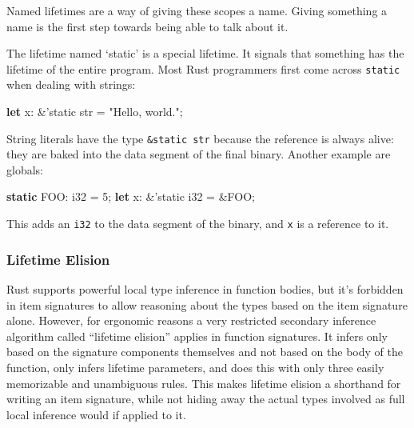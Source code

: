 \documentclass[a4paper,]{book}
\newenvironment{Shaded}{\begin{snugshade}}{\end{snugshade}}
\newcommand{\KeywordTok}[1]{\textcolor[rgb]{0.13,0.29,0.53}{\textbf{{#1}}}}
\newcommand{\DataTypeTok}[1]{\textcolor[rgb]{0.13,0.29,0.53}{{#1}}}
\newcommand{\DecValTok}[1]{\textcolor[rgb]{0.00,0.00,0.81}{{#1}}}
\newcommand{\StringTok}[1]{\textcolor[rgb]{0.31,0.60,0.02}{{#1}}}
\newcommand{\OtherTok}[1]{\textcolor[rgb]{0.56,0.35,0.01}{{#1}}}
\newcommand{\NormalTok}[1]{{#1}}
\begin{document}
Named lifetimes are a way of giving these scopes a name. Giving
something a name is the first step towards being able to talk about it.


The lifetime named `static' is a special lifetime. It signals that
something has the lifetime of the entire program. Most Rust programmers
first come across \texttt{\textquotesingle{}static} when dealing with
strings:

\begin{Shaded}
\begin{Highlighting}[]
\KeywordTok{let} \NormalTok{x: &}\OtherTok{'static} \DataTypeTok{str} \NormalTok{= }\StringTok{"Hello, world."}\NormalTok{;}
\end{Highlighting}
\end{Shaded}

String literals have the type \texttt{\&\textquotesingle{}static\ str}
because the reference is always alive: they are baked into the data
segment of the final binary. Another example are globals:

\begin{Shaded}
\begin{Highlighting}[]
\KeywordTok{static} \NormalTok{FOO: }\DataTypeTok{i32} \NormalTok{= }\DecValTok{5}\NormalTok{;}
\KeywordTok{let} \NormalTok{x: &}\OtherTok{'static} \DataTypeTok{i32} \NormalTok{= &FOO;}
\end{Highlighting}
\end{Shaded}

This adds an \texttt{i32} to the data segment of the binary, and
\texttt{x} is a reference to it.

\subsubsection{Lifetime Elision}\label{lifetime-elision}

Rust supports powerful local type inference in function bodies, but it's
forbidden in item signatures to allow reasoning about the types based on
the item signature alone. However, for ergonomic reasons a very
restricted secondary inference algorithm called ``lifetime elision''
applies in function signatures. It infers only based on the signature
components themselves and not based on the body of the function, only
infers lifetime parameters, and does this with only three easily
memorizable and unambiguous rules. This makes lifetime elision a
shorthand for writing an item signature, while not hiding away the
actual types involved as full local inference would if applied to it.
\end{document}
